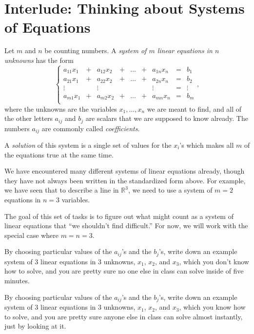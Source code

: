 \documentclass[cahier-main.tex]{subfiles}
\begin{document}
\chapter{Interlude: Thinking about Systems of Equations}

\begin{definition}
Let $m$ and $n$ be counting numbers. A \emph{system of $m$ linear equations in $n$ unknowns} has the form
\[
\left\{\begin{array}{rrrrrrrrr}
a_{11} x_1 & + & a_{12} x_2 & + & \dots & + & a_{1n} x_n & = & b_1 \\
a_{21} x_1 & + & a_{22} x_2 & + & \dots & + & a_{2n} x_n & = & b_2 \\
\vdots & & \vdots & & & & \vdots & = & \vdots \\
a_{m1} x_1 & + & a_{m2} x_2 & + & \dots & + & a_{mn} x_n & = & b_m \\

\end{array}\right. ,
\]
where the unknowns are the variables $x_1, \ldots, x_n$ we are meant to find, and
all of the other letters $a_{ij}$ and $b_j$ are scalars that we are supposed to know already. The numbers $a_{ij}$ are commonly called \emph{coefficients}.

A \emph{solution} of this system is a single set of values for the $x_i$'s which makes 
all $m$ of the equations true at the same time.
\end{definition}

We have encountered many different systems of linear equations already, though they 
have not always been written in the standardized form above. For example, we have seen
that to describe a line in $\mathbb{R}^3$, we need to use a system of $m=2$ equations in 
$n=3$ variables.

The goal of this set of tasks is to figure out what might count as a system of linear
equations that ``we shouldn't find difficult.'' For now, we will work with the special case where $m=n=3$.

\begin{task}
By choosing particular values of the $a_{ij}$'s and the $b_j$'s,
write down an example system of $3$ linear equations in $3$ unknowns, $x_1$, $x_2$, and $x_3$, which you don't know how to solve, and you are pretty sure no one else in class can solve inside of five minutes.
\end{task}

\begin{task}
By choosing particular values of the $a_{ij}$'s and the $b_j$'s,
write down an example system of $3$ linear equations in $3$ unknowns, $x_1$, $x_2$, and $x_3$, which you know how to solve, and you are pretty sure anyone else in class can solve almost instantly, just by looking at it.
\end{task}
\end{document}
